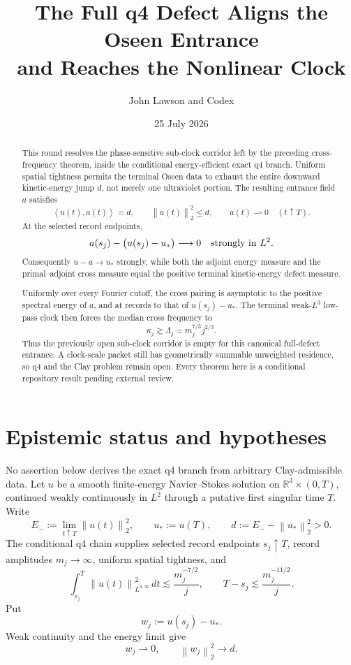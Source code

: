 \documentclass[11pt]{article}
\title{The Full q4 Defect Aligns the Oseen Entrance\\
and Reaches the Nonlinear Clock}
\author{John Lawson and Codex}
\date{25 July 2026}
\theoremstyle{remark}
\newcommand{\R}{\mathbb R}
\newcommand{\norm}[1]{\left\|#1\right\|}
\newcommand{\ip}[2]{\left\langle#1,#2\right\rangle}
\newcommand{\weakto}{\rightharpoonup}
\begin{document}
\maketitle

\begin{abstract}
This round resolves the phase-sensitive sub-clock corridor left by the
preceding cross-frequency theorem, inside the conditional
energy-efficient exact q4 branch.  Uniform spatial tightness permits the
terminal Oseen data to exhaust the entire downward kinetic-energy jump
\(d\), not merely one ultraviolet portion.  The resulting entrance
field \(a\) satisfies
\[
 \ip{u(t)}{a(t)}=d,\qquad
 \norm{a(t)}_2^2\leq d,\qquad
 a(t)\weakto0
 \quad(t\uparrow T).
\]
At the selected record endpoints,
\[
 a(s_j)-\bigl(u(s_j)-u_*\bigr)\longrightarrow0
 \quad\hbox{strongly in }L^2.
\]
Consequently \(u-a\to u_*\) strongly, while both the adjoint energy
measure and the primal--adjoint cross measure equal the positive
terminal kinetic-energy defect measure.

Uniformly over every Fourier cutoff, the cross pairing is asymptotic to
the positive spectral energy of \(a\), and at records to that of
\(u(s_j)-u_*\).  The terminal weak-\(L^3\) low-pass clock then forces
the median cross frequency to
\[
 \kappa_j\gtrsim
 \Lambda_j=m_j^{7/3}j^{2/3}.
\]
Thus the previously open sub-clock corridor is empty for this canonical
full-defect entrance.  A clock-scale packet still has geometrically
summable unweighted residence, so q4 and the Clay problem remain open.
Every theorem here is a conditional repository result pending external
review.
\end{abstract}

\section{Epistemic status and hypotheses}

No assertion below derives the exact q4 branch from arbitrary
Clay-admissible data.  Let \(u\) be a smooth finite-energy
Navier--Stokes solution on \(\R^3\times(0,T)\), continued weakly
continuously in \(L^2\) through a putative first singular time \(T\).
Write
\begin{equation}
\label{eq:defect}
 E_-:=\lim_{t\uparrow T}\norm{u(t)}_2^2,\qquad
 u_*:=u(T),\qquad
 d:=E_--\norm{u_*}_2^2>0.
\end{equation}
The conditional q4 chain supplies selected record endpoints
\(s_j\uparrow T\), record amplitudes \(m_j\to\infty\), uniform spatial
tightness, and
\begin{equation}
\label{eq:q4tails}
 \int_{s_j}^T
 \norm{u(t)}_{L^{3,\infty}}^2\,dt
 \lesssim \frac{m_j^{-7/2}}{j},
 \qquad
 T-s_j\lesssim\frac{m_j^{-11/2}}{j}.
\end{equation}
Put
\begin{equation}
\label{eq:wj}
 w_j:=u(s_j)-u_*.
\end{equation}
Weak continuity and the energy limit give
\begin{equation}
\label{eq:wlimits}
 w_j\weakto0,\qquad
 \norm{w_j}_2^2\longrightarrow d.
\end{equation}
\end{document}
